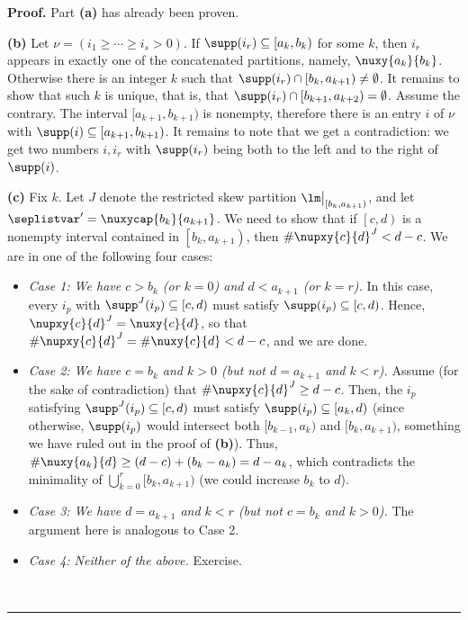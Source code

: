 \documentclass[numbers=enddot,12pt,final,onecolumn,notitlepage]{scrartcl}%
\theoremstyle{definition}
\newenvironment{proof}[1][Proof]{\noindent\textbf{#1.} }{\ \rule{0.5em}{0.5em}}
\begin{document}
\begin{proof}
Part \textbf{(a)} has already been proven.

\textbf{(b)} Let $\nu=(i_1\geq\cdots\geq i_s>0)$. If $\supp(i_r)\subseteq [a_k,b_k)$ for some $k$, then $i_r$ appears in exactly one of the concatenated partitions, namely, $\nuxy{a_k}{b_k}$. Otherwise there is an integer $k$ such that $\supp(i_r)\cap [b_k,a_{k+1})\neq\emptyset$. It remains to show that such $k$ is unique, that is, that $\supp(i_r)\cap [b_{k+1},a_{k+2})=\emptyset$. Assume the contrary. The interval $[a_{k+1},b_{k+1})$ is nonempty, therefore there is an entry $i$ of $\nu$ with $\supp(i)\subseteq [a_{k+1},b_{k+1})$. It remains to note that we get a contradiction: we get two numbers $i,i_r$ with $\supp(i_r)$ being both to the left and to the right of $\supp(i)$. 

\textbf{(c)} Fix $k$. Let $J$ denote the restricted skew partition $\lm\big|_{[b_k,a_{k+1})}$, and let $\seplistvar^{\prime} = \nuxycap{b_k}{a_{k+1}}$.
We need to show that if $\left[c,d\right)$ is a nonempty interval contained in $\left[b_k, a_{k+1}\right)$, then $\#\nupxy{c}{d}^{J} < d-c$. We are in one of the following four cases:

\begin{itemize}
\item \textit{Case 1: We have $c> b_k$ (or $k=0$) and $d< a_{k+1}$ (or $k=r$).} In this case, every $i_p$ with $\supp^J(i_p) \subseteq [c,d)$ must satisfy $\supp(i_p) \subseteq [c,d)$. Hence, $\nupxy{c}{d}^{J} = \nuxy{c}{d}$, so that $\#\nupxy{c}{d}^{J} = \#\nuxy{c}{d} < d-c$, and we are done.
\item \textit{Case 2: We have $c=b_k$ and $k>0$ (but not $d=a_{k+1}$ and $k<r$).} Assume (for the sake of contradiction) that $\#\nupxy{c}{d}^{J} \geq d-c$. Then, the $i_p$ satisfying $\supp^J(i_p) \subseteq [c,d)$ must satisfy $\supp(i_p) \subseteq [a_k, d)$ (since otherwise, $\supp(i_p)$ would intersect both $[b_{k-1}, a_k)$ and $[b_k, a_{k+1})$, something we have ruled out in the proof of \textbf{(b)}). Thus, $\#\nuxy{a_k}{d} \geq (d-c)+(b_k-a_k) = d-a_k$, which contradicts the minimality of $\bigcup_{k=0}^{r}[b_k,a_{k+1})$ (we could increase $b_k$ to $d$).
\item \textit{Case 3: We have $d=a_{k+1}$ and $k<r$ (but not $c=b_k$ and $k>0$).} The argument here is analogous to Case 2.
\item \textit{Case 4: Neither of the above.} Exercise.
\end{itemize}
\end{proof}
\end{document}
